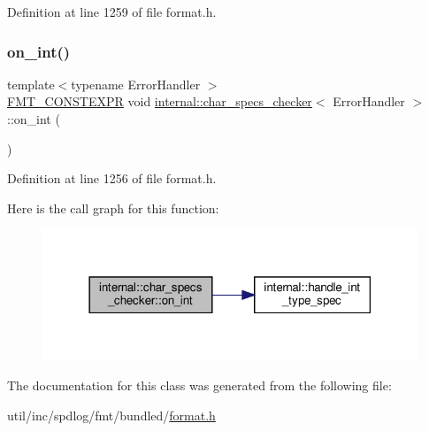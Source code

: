 Definition at line 1259 of file format.\+h.

\mbox{\label{classinternal_1_1char__specs__checker_ad73dc97475d308a789f4bb1581211bec}} 
\subsubsection{\texorpdfstring{on\+\_\+int()}{on\_int()}}
{\footnotesize\ttfamily template$<$typename Error\+Handler $>$ \\
\hyperlink{core_8h_a69201cb276383873487bf68b4ef8b4cd}{F\+M\+T\+\_\+\+C\+O\+N\+S\+T\+E\+X\+PR} void \hyperlink{classinternal_1_1char__specs__checker}{internal\+::char\+\_\+specs\+\_\+checker}$<$ Error\+Handler $>$\+::on\+\_\+int (\begin{DoxyParamCaption}{ }\end{DoxyParamCaption})\hspace{0.3cm}{\ttfamily [inline]}}



Definition at line 1256 of file format.\+h.

Here is the call graph for this function\+:
\nopagebreak
\begin{figure}[H]
\begin{center}
\leavevmode
\includegraphics[width=318pt]{classinternal_1_1char__specs__checker_ad73dc97475d308a789f4bb1581211bec_cgraph}
\end{center}
\end{figure}


The documentation for this class was generated from the following file\+:\begin{DoxyCompactItemize}
\item 
util/inc/spdlog/fmt/bundled/\hyperlink{format_8h}{format.\+h}\end{DoxyCompactItemize}
